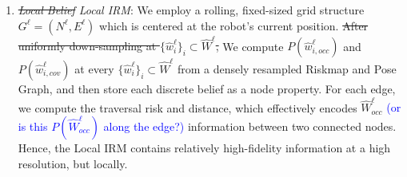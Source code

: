 \documentclass[letterpaper]{article} %
\begin{document}
\begin{enumerate}[label={\arabic*)}]
  \itemsep0em 
  \setlength{\itemsep}{0.2em}
  \item \textit{\st{Local Belief} Local IRM}: 
We employ a rolling, fixed-sized grid structure $G^\ell = (N^\ell, E^\ell)$ which is centered at the robot's current position.
\st{After uniformly down-sampling at $\{\hat{w}^\ell_i\}_i \subset \hat{W}^\ell$,} We compute $P(\hat{w}^\ell_{i,occ})$ and $P(\hat{w}^\ell_{i,cov})$ at every $\{\hat{w}^\ell_i\}_i \subset \hat{W}^\ell$ from a densely resampled Riskmap and Pose Graph, and then store each discrete belief as a node property. For each edge, we compute the traversal risk and distance, which effectively encodes $\hat{W}^\ell_{occ}$ \textcolor{blue}{(or is this $P(\hat{W}^\ell_{occ})$ along the edge?)} information between two connected nodes.
Hence, the Local IRM contains relatively high-fidelity information at a high resolution, but locally.


\end{enumerate}
\end{document}
